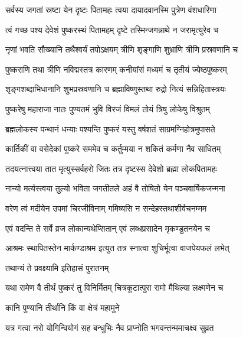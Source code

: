 \twolineshloka
{सर्वस्य जगतां स्रष्टा येन दृष्टः पितामहः}
{त्वया दायादवानस्मि पुत्रेण वंशधारिणा} %

\twolineshloka
{त्वं गच्छ पश्य देवेशं पुष्करस्थं पितामहम्}
{दृष्टे तस्मिन्जगन्नाथे न जरामृत्युरेव च} %

\twolineshloka
{नृणां भवति सौख्यानि तथैश्वर्यं तपोऽक्षयम्}
{त्रीणि शृङ्गाणि शुभ्राणि त्रीणि प्रस्रवणानि च} %

\twolineshloka
{पुष्कराणि तथा त्रीणि नविद्मस्तत्र कारणम्}
{कनीयांसं मध्यमं च तृतीयं ज्येष्ठपुष्करम्} %

\twolineshloka
{शृङ्गशब्दाभिधानानि शुभप्रस्रवणानि च}
{ब्रह्माविष्णुस्तथा रुद्रो नित्यं सन्निहितास्त्रयः} %

\twolineshloka
{पुष्करेषु महाराजा नातः पुण्यतमं भुवि}
{विरजं विमलं तोयं त्रिषु लोकेषु विश्रुतम्} %

\twolineshloka
{ब्रह्मलोकस्य पन्थानं धन्याः पश्यन्ति पुष्करं}
{यस्तु वर्षशतं साग्रमग्निहोत्रमुपासते} %

\twolineshloka
{कार्तिकीं वा वसेदेकां पुष्करे सममेव च}
{कर्तुम्मया न शकितं कर्मणा नैव साधितम्} %

\twolineshloka
{तदयत्नात्त्वया तात मृत्युस्सर्वहरो जितः}
{तत्र दृष्टस्स देवेशो ब्रह्मा लोकपितामहः} %

\twolineshloka
{नान्यो मर्त्यस्त्वया तुल्यो भविता जगतीतले}
{अहं वै तोषितो येन पञ्चवार्षिकजन्मना} %

\twolineshloka
{वरेण त्वं मदीयेन उपमां चिरजीविनाम्}
{गमिष्यसि न सन्देहस्तथाशीर्वचनम्मम} %

\twolineshloka
{एवं वदन्ति ते सर्वे व्रज लोकान्यथेप्सितान्}
{एवं लब्धप्रसादेन मृकण्डुतनयेन च} %

\twolineshloka
{आश्रमः स्थापितस्तेन मार्कण्डाश्रम इत्युत}
{तत्र स्नात्वा शुचिर्भूत्वा वाजपेयफलं लभेत्} %




\onelineshloka
{तथान्यं ते प्रवक्ष्यामि इतिहासं पुरातनम्} %

\twolineshloka
{यथा रामेण वै तीर्थं पुष्करं तु विनिर्मितम्}
{चित्रकूटात्पुरा रामो मैथिल्या लक्ष्मणेन च} %




\onelineshloka
{कानि पुण्यानि तीर्थानि किं वा क्षेत्रं महामुने} %

\twolineshloka
{यत्र गत्वा नरो योगिन्वियोगं सह बन्धुभिः}
{नैव प्राप्नोति भगवन्तन्ममाचक्ष्व सुव्रत} %

